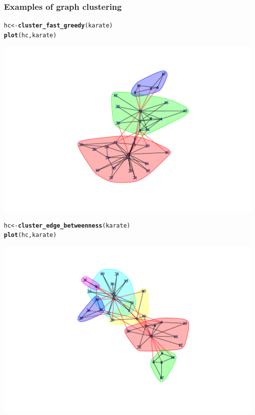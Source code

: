 \documentclass{beamer}\usepackage[]{graphicx}\usepackage[]{color}
\makeatletter
\newcommand{\hlstd}[1]{\textcolor[rgb]{0.345,0.345,0.345}{#1}}%
\newcommand{\hlkwb}[1]{\textcolor[rgb]{0.69,0.353,0.396}{#1}}%
\newcommand{\hlkwd}[1]{\textcolor[rgb]{0.737,0.353,0.396}{\textbf{#1}}}%
\newenvironment{kframe}{%
 \def\at@end@of@kframe{}%
 \ifinner\ifhmode%
  \def\at@end@of@kframe{\end{minipage}}%
  \begin{minipage}{\columnwidth}%
 \fi\fi%
 \def\FrameCommand##1{\hskip\@totalleftmargin \hskip-\fboxsep
 \colorbox{shadecolor}{##1}\hskip-\fboxsep
     \hskip-\linewidth \hskip-\@totalleftmargin \hskip\columnwidth}%
 \MakeFramed {\advance\hsize-\width
   \@totalleftmargin\z@ \linewidth\hsize
   \@setminipage}}%
 {\par\unskip\endMakeFramed%
 \at@end@of@kframe}
\newenvironment{knitrout}{}{} %
\makeatother
\begin{document}
\begin{frame}
  \frametitle{Examples of graph clustering}

\begin{knitrout}\scriptsize
{}\color{fgcolor}\begin{kframe}
\begin{alltt}
\hlstd{hc} \hlkwb{<-} \hlkwd{cluster_fast_greedy}\hlstd{(karate)}
\hlkwd{plot}\hlstd{(hc,karate)}
\end{alltt}
\end{kframe}
\includegraphics[width=.8\textwidth]{figures/unnamed-chunk-1-1} 

\end{knitrout}

\begin{knitrout}\scriptsize
{}\color{fgcolor}\begin{kframe}
\begin{alltt}
\hlstd{hc} \hlkwb{<-} \hlkwd{cluster_edge_betweenness}\hlstd{(karate)}
\hlkwd{plot}\hlstd{(hc,karate)}
\end{alltt}
\end{kframe}
\includegraphics[width=.8\textwidth]{figures/unnamed-chunk-2-1} 


\end{knitrout}
\end{frame}
\end{document}
